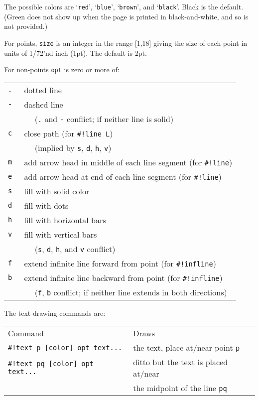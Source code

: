 \documentclass[12pt]{article}
\begin{document}
The possible colors
are `{\tt red}', `{\tt blue}', `{\tt brown}', and `{\tt black}'.  Black is
the default.
(Green does not show up when the page is printed in black-and-white, and
so is not provided.)

For points, {\tt size} is an integer in the range [1,18] giving the size
of each point in units of 1/72'nd inch (1pt).  The default is 2pt.

\begin{minipage}{\textwidth}
For non-points {\tt opt} is zero or more of:
\\[1ex]
\hspace*{0.5in}\begin{tabular}{rl}
    \tt . & dotted line \\
    \tt - & dashed line \\
          & ~~ ({\tt .} and {\tt -} conflict; if neither line is solid) \\
    \tt c & close path (for {\tt \#!line L}) \\
          & ~~ (implied by {\tt s}, {\tt d}, {\tt h}, {\tt v}) \\
    \tt m & add arrow head in middle of each line segment (for {\tt \#!line}) \\
    \tt e & add arrow head at end of each line segment (for {\tt \#!line}) \\
    \tt s & fill with solid color \\
    \tt d & fill with dots \\
    \tt h & fill with horizontal bars \\
    \tt v & fill with vertical bars \\
          & ~~ ({\tt s}, {\tt d}, {\tt h}, and {\tt v} conflict) \\
    \tt f & extend infinite line forward from point
            (for {\tt \#!infline}) \\
    \tt b & extend infinite line backward from point
            (for {\tt \#!infline}) \\
          & ~~ ({\tt f}, {\tt b} conflict; if neither
	        line extends in both directions) \\
    \end{tabular}
\end{minipage}

\begin{minipage}{\textwidth}
The text drawing commands are:
\\[1ex]
\begin{tabular}{@{}l@{~~~~~}l@{}}
\underline{Command} & \underline{Draws}
\\[1ex]
\tt \#!text p [color] opt text... &
    the text, place at/near point {\tt p} \\
\tt \#!text pq [color] opt text... &
    ditto but the text is placed at/near \\
    & the midpoint of the line {\tt pq}
\end{tabular}
\end{minipage}
\end{document}
